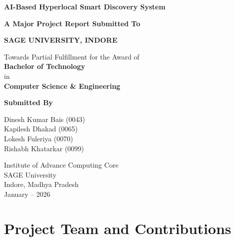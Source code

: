 \documentclass[12pt,a4paper]{report}
\begin{document}

\begin{titlepage}

\centering

\vspace*{1cm}

{\Huge \textbf{AI-Based Hyperlocal Smart Discovery System}}

\vspace{1.5cm}

\textbf{A Major Project Report Submitted To}

\vspace{0.5cm}

\textbf{SAGE UNIVERSITY, INDORE}

\vspace{1cm}

Towards Partial Fulfillment for the Award of\\

\textbf{Bachelor of Technology}\\

in\\

\textbf{Computer Science \& Engineering}

\vspace{1cm}

\textbf{Submitted By}

\vspace{0.5cm}

Dinesh Kumar Bais (0043)\\

Kapilesh Dhakad (0065)\\

Lokesh Fuleriya (0070)\\

Rishabh Khatarkar (0099)

\vfill

Institute of Advance Computing Core\\

SAGE University\\

Indore, Madhya Pradesh\\

January – 2026

\end{titlepage}

\tableofcontents

\newpage

\section*{Project Team and Contributions}
\end{document}

